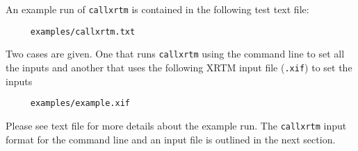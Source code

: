 \noindent
An example run of \texttt{callxrtm} is contained in the following test text file:
\begin{verbatim}
     examples/callxrtm.txt
\end{verbatim}
Two cases are given.  One that runs \texttt{callxrtm} using the command line to set all the inputs and another that uses the following XRTM input file (\texttt{.xif}) to set the inputs
\begin{verbatim}
     examples/example.xif
\end{verbatim}
Please see text file for more details about the example run.  The \texttt{callxrtm} input format for the command line and an input file is outlined in the next section.


\label{xrtm_utilities_stand_alone_execution_callxrtm_callxrtm_options}


\label{xrtm_utilities_stand_alone_execution_callxrtm_callxrtm_input_format}


%




%

%



